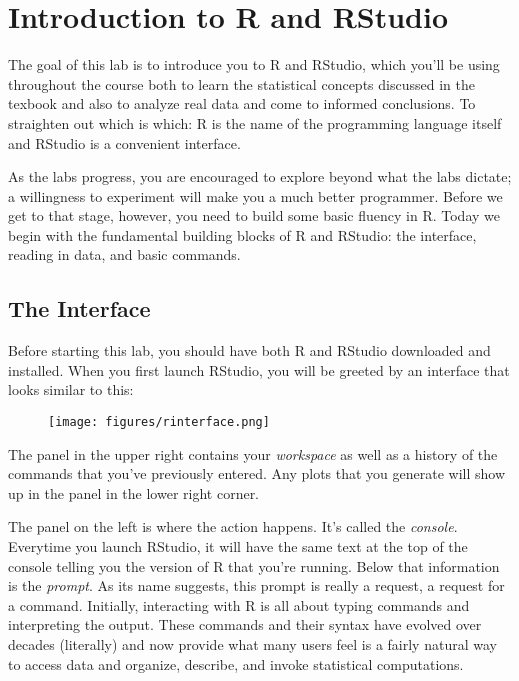 \documentclass[11pt]{article}
\begin{document}
\let\thefootnote\relax{}

\section*{Introduction to R and RStudio}

The goal of this lab is to introduce you to R and RStudio, which you'll be using throughout the course both to learn the statistical concepts discussed in the texbook and also to analyze real data and come to informed conclusions.  To straighten out which is which: R is the name of the programming language itself and RStudio is a convenient interface.

As the labs progress, you are encouraged to explore beyond what the labs dictate; a willingness to experiment will make you a much better programmer.  Before we get to that stage, however, you need to build some basic fluency in R.  Today we begin with the fundamental building blocks of R and RStudio: the interface, reading in data, and basic commands.

\subsection*{The Interface}
Before starting this lab, you should have both R and RStudio downloaded and installed.  When you first launch RStudio, you will be greeted by an interface that looks similar to this:

\begin{figure}[h]
   \centering
	\texttt{[image: figures/rinterface.png]}
\end{figure}

The panel in the upper right contains your \emph{workspace} as well as a history of the commands that you've previously entered.  Any plots that you generate will show up in the panel in the lower right corner.

The panel on the left is where the action happens.  It's called the \emph{console}.  Everytime you launch RStudio, it will have the same text at the top of the console telling you the version of R that you're running.  Below that information is the \emph{prompt}.  As its name suggests, this prompt is really a request, a request for a command.  Initially, interacting with R is all about typing commands and interpreting the output. These commands and their syntax have evolved over decades (literally) and now provide what many users feel is a fairly natural way to access data and organize, describe, and invoke statistical computations.
\end{document}

